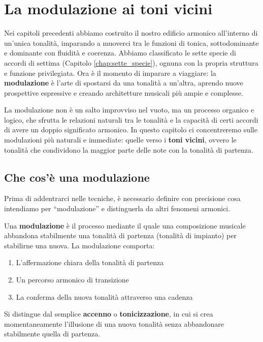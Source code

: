 \chapter{La modulazione ai toni vicini}
\label{chap:modulazione}

Nei capitoli precedenti abbiamo costruito il nostro edificio armonico all'interno di un'unica tonalità, imparando a muoverci tra le funzioni di tonica, sottodominante e dominante con fluidità e coerenza. Abbiamo classificato le sette specie di accordi di settima (Capitolo \ref{chap:sette_specie}), ognuna con la propria struttura e funzione privilegiata. Ora è il momento di imparare a viaggiare: la \textbf{modulazione} è l'arte di spostarsi da una tonalità a un'altra, aprendo nuove prospettive espressive e creando architetture musicali più ampie e complesse.

La modulazione non è un salto improvviso nel vuoto, ma un processo organico e logico, che sfrutta le relazioni naturali tra le tonalità e la capacità di certi accordi di avere un doppio significato armonico. In questo capitolo ci concentreremo sulle modulazioni più naturali e immediate: quelle verso i \textbf{toni vicini}, ovvero le tonalità che condividono la maggior parte delle note con la tonalità di partenza.

\section{Che cos'è una modulazione}
\label{sec:definizione_modulazione}

Prima di addentrarci nelle tecniche, è necessario definire con precisione cosa intendiamo per ``modulazione'' e distinguerla da altri fenomeni armonici.

\begin{definizione}[Modulazione]
	\label{def:modulazione}
	Una \textbf{modulazione} è il processo mediante il quale una composizione musicale abbandona stabilmente una tonalità di partenza (tonalità di impianto) per stabilirne una nuova. La modulazione comporta:
	\begin{enumerate}
		\item L'affermazione chiara della tonalità di partenza
		\item Un percorso armonico di transizione
		\item La conferma della nuova tonalità attraverso una cadenza
	\end{enumerate}
	
	Si distingue dal semplice \textbf{accenno} o \textbf{tonicizzazione}, in cui si crea momentaneamente l'illusione di una nuova tonalità senza abbandonare stabilmente quella di partenza.
\end{definizione}

